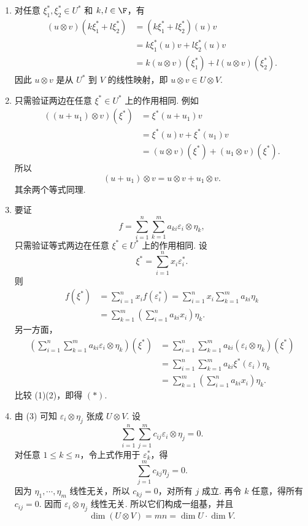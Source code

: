 \begin{solution}
	\begin{enumerate}
		\item 对任意 $\xi_1^*,\xi_2^*\in U^*$ 和 $k,l\in\F$，有
		\[
		\begin{aligned}
			(u\otimes v)(k\xi_1^*+l\xi_2^*)
			&=(k\xi_1^*+l\xi_2^*)(u)v \\
			&=k\xi_1^*(u)v+l\xi_2^*(u)v \\
			&=k(u\otimes v)(\xi_1^*)+l(u\otimes v)(\xi_2^*).
		\end{aligned}
		\]
		因此 $u\otimes v$ 是从 $U^*$ 到 $V$ 的线性映射，即 $u\otimes v\in U\otimes V$.
		
		\item 只需验证两边在任意 $\xi^*\in U^*$ 上的作用相同. 例如
		\[
		\begin{aligned}
			((u+u_1)\otimes v)(\xi^*)
			&=\xi^*(u+u_1)v \\
			&=\xi^*(u)v+\xi^*(u_1)v \\
			&=(u\otimes v)(\xi^*)+(u_1\otimes v)(\xi^*).
		\end{aligned}
		\]
		所以
		\[
		(u+u_1)\otimes v=u\otimes v+u_1\otimes v.
		\]
		其余两个等式同理.
		
		\item 要证
		\[
		f=\sum_{i=1}^n\sum_{k=1}^m a_{ki}\varepsilon_i\otimes\eta_k,
		\tag{$*$}
		\]
		只需验证等式两边在任意 $\xi^*\in U^*$ 上的作用相同. 设
		\[
		\xi^*=\sum_{i=1}^n x_i\varepsilon_i^*.
		\]
		则
		\[
		\begin{aligned}
			f(\xi^*)
			&=\sum_{i=1}^n x_if(\varepsilon_i^*)
			=\sum_{i=1}^n x_i\sum_{k=1}^m a_{ki}\eta_k \\
			&=\sum_{k=1}^m\left(\sum_{i=1}^n a_{ki}x_i\right)\eta_k.
		\end{aligned}
		\tag{1}
		\]
		另一方面，
		\[
		\begin{aligned}
			\left(\sum_{i=1}^n\sum_{k=1}^m a_{ki}\varepsilon_i\otimes\eta_k\right)(\xi^*)
			&=\sum_{i=1}^n\sum_{k=1}^m a_{ki}(\varepsilon_i\otimes\eta_k)(\xi^*) \\
			&=\sum_{i=1}^n\sum_{k=1}^m a_{ki}\xi^*(\varepsilon_i)\eta_k \\
			&=\sum_{k=1}^m\left(\sum_{i=1}^n a_{ki}x_i\right)\eta_k.
		\end{aligned}
		\tag{2}
		\]
		比较 (1)(2)，即得 $(*)$.
		
		\item 由 (3) 可知 $\varepsilon_i\otimes\eta_j$ 张成 $U\otimes V$. 设
		\[
		\sum_{i=1}^n\sum_{j=1}^m c_{ij}\varepsilon_i\otimes\eta_j=0.
		\]
		对任意 $1\le k\le n$，令上式作用于 $\varepsilon_k^*$，得
		\[
		\sum_{j=1}^m c_{kj}\eta_j=0.
		\]
		因为 $\eta_1,\cdots,\eta_m$ 线性无关，所以 $c_{kj}=0$，对所有 $j$ 成立. 再令 $k$ 任意，得所有 $c_{ij}=0$. 因而 $\varepsilon_i\otimes\eta_j$ 线性无关. 所以它们构成一组基，并且
		\[
		\dim(U\otimes V)=mn=\dim U\cdot \dim V.
		\]
		

\end{enumerate}
\end{solution}
